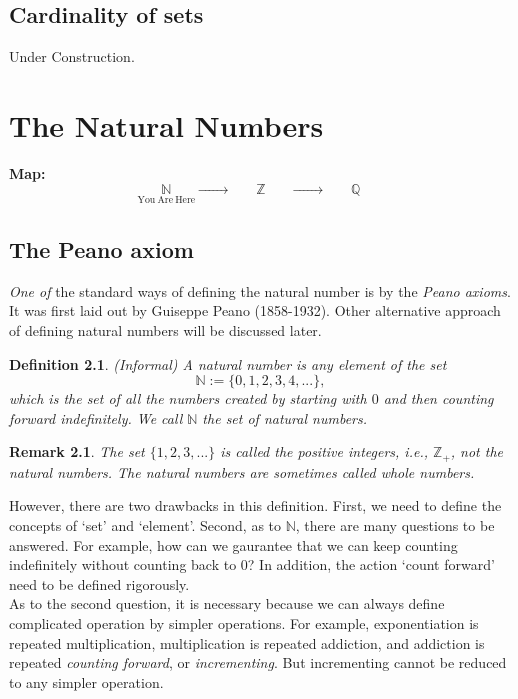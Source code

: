\documentclass[a4paper]{book}
\theoremstyle{break}
\newtheorem{definition}{Definition}[section]
\newtheorem{remark}{Remark}[section]
\begin{document}
		\section{Cardinality of sets}
			\label{Cardinality of sets}
			Under Construction.
	\chapter{The Natural Numbers}
		\label{The Natural Numbers}
		\textbf{Map:}
		\begin{equation*}
			\underset{\mathrm{You~Are~Here}}{\mathbb{N}} \xrightarrow{\quad \quad\quad}\underset{\mathrm{\phantom{\mathrm{You~Are~Here}}}}{\mathbb{Z}}\xrightarrow{\quad\quad\quad}\underset{\mathrm{\phantom{\mathrm{You~Are~Here}}}}{\mathbb{Q}}
		\end{equation*}
		\section{The Peano axiom}
			\textit{One of} the standard ways of defining the natural number is by the \textit{Peano axioms}. It was first laid out by Guiseppe Peano (1858-1932). Other alternative approach of defining natural numbers will be discussed later.
			\begin{definition}
				(Informal) A \textit{natural number} is any element of the set $$\mathbb{N} := \{0,1,2,3,4,...\},$$ which is the set of all the numbers created by starting with $0$ and then counting forward indefinitely. We call $\mathbb{N}$ the \textit{set of natural numbers}.
			\end{definition}
			\begin{remark}
				The set $\{1,2,3,...\}$ is called \textit{the positive integers}, i.e., ${\mathbb{Z}}_{+}$, not the natural numbers. The natural numbers are sometimes called \textit{whole numbers}.
			\end{remark}
			However, there are two drawbacks in this definition. First, we need to define the concepts of `set' and `element'. Second, as to $\mathbb{N}$, there are many questions to be answered. For example, how can we gaurantee that we can keep counting indefinitely without counting back to $0$? In addition, the action `count forward' need to be defined rigorously.\\
			As to the second question, it is necessary because we can always define complicated operation by simpler operations. For example, exponentiation is repeated multiplication, multiplication is repeated addiction, and addiction is repeated \textit{counting forward}, or \textit{incrementing}. But incrementing cannot be reduced to any simpler operation.\\
\end{document}
